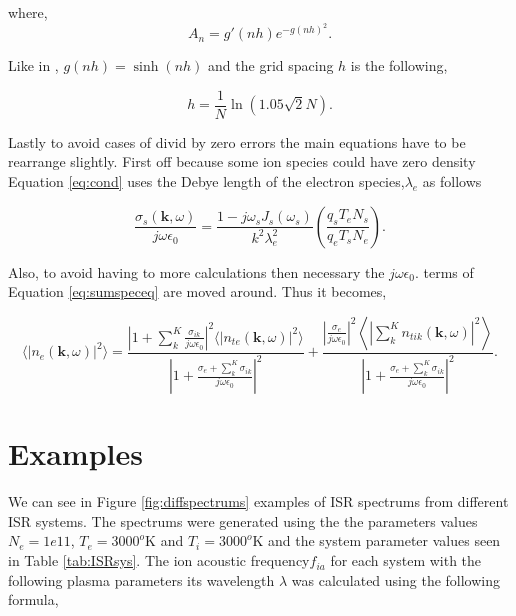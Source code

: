 \documentclass[10pt]{report}
\begin{document}
\noindent where,
\begin{equation}
\label{eq:anterm}
A_n = g'(nh)e^{-g(nh)^2}.
\end{equation}

\noindent Like in \cite{Ooi:2007jx}, $g(nh) = \sinh (nh)$ and the grid spacing $h$ is the following,

\begin{equation}
\label{eq:hterm}
h = \frac{1}{N}\ln(1.05\sqrt{2}N).
\end{equation} 


Lastly to avoid cases of divid by zero errors the main equations have to be rearrange slightly. First off because some ion species could have zero density Equation \ref{eq:cond} uses the Debye length of the electron species,$\lambda_e$ as follows

\begin{equation}
\label{eq:condnew}
\frac{\sigma_{s}(\mathbf{k},\omega)}{j\omega\epsilon_0} = \frac{1-j\omega_s J_s(\omega_s)}{k^2\lambda_e^2} \left(\frac{q_sT_eN_s}{q_eT_sN_e}\right).
\end{equation}

Also, to avoid having to more calculations then necessary the $j\omega\epsilon_0$. terms of Equation \ref{eq:sumspeceq} are moved around. Thus it becomes,

\begin{equation}
\label{eq:sumspeceqfinal}
\displaystyle \langle \left|n_e(\mathbf{k},\omega)\right|^2\rangle =  \frac{\left|1 +  \sum_k^K\frac{\sigma_{ik}}{j\omega\epsilon_0} \right|^2 \langle |n_{te}(\mathbf{k},\omega)|^2\rangle}{\left|1 +\frac{\sigma_e+ \sum_k^K\sigma_{ik}}{j\omega\epsilon_0} \right|^2} + \frac{\left| \frac{\sigma_e}{j\omega\epsilon_0} \right|^2\left \langle \left|\sum_k^Kn_{tik}(\mathbf{k},\omega)\right|^2\right\rangle}{\left|1 +\frac{\sigma_e+ \sum_k^K\sigma_{ik}}{j\omega\epsilon_0} \right|^2}.
\end{equation}

\section*{Examples}
We can see in Figure \ref{fig:diffspectrums} examples of ISR spectrums from different ISR systems. The spectrums were generated using the the parameters values $N_e=1e11$, $T_e=3000^o$K and $T_i=3000^o$K and the system parameter values seen in Table \ref{tab:ISRsys}. The ion acoustic frequency$f_{ia}$ for each system with the following plasma parameters its wavelength $\lambda$ was calculated using the following formula,
\end{document}

